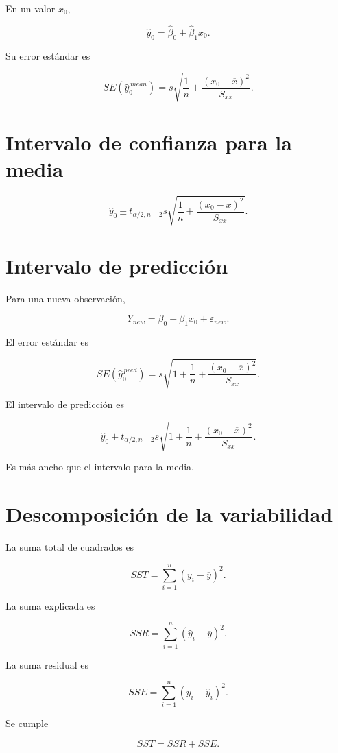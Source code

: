 \documentclass[
  spanish,
  11pt,
  letterpaper,
  DIV=11,
  numbers=noendperiod]{scrreprt}
\theoremstyle{definition}
\theoremstyle{plain}
\theoremstyle{definition}
\theoremstyle{remark}
\begin{document}
En un valor \(x_0\),

\[
\widehat{y}_0
=
\widehat{\beta}_0
+
\widehat{\beta}_1x_0.
\]

Su error estándar es

\[
SE
(
\widehat{y}_0^{\,mean}
)
=
s
\sqrt{
\frac{1}{n}
+
\frac{
(x_0-\overline{x})^2
}{
S_{xx}
}
}.
\]

\section{Intervalo de confianza para la
media}\label{intervalo-de-confianza-para-la-media}

\[
\widehat{y}_0
\pm
t_{\alpha/2,n-2}
s
\sqrt{
\frac{1}{n}
+
\frac{
(x_0-\overline{x})^2
}{
S_{xx}
}
}.
\]

\section{Intervalo de predicción}\label{intervalo-de-predicciuxf3n}

Para una nueva observación,

\[
Y_{new}
=
\beta_0+\beta_1x_0+\varepsilon_{new}.
\]

El error estándar es

\[
SE
(
\widehat{y}_0^{\,pred}
)
=
s
\sqrt{
1
+
\frac{1}{n}
+
\frac{
(x_0-\overline{x})^2
}{
S_{xx}
}
}.
\]

El intervalo de predicción es

\[
\widehat{y}_0
\pm
t_{\alpha/2,n-2}
s
\sqrt{
1
+
\frac{1}{n}
+
\frac{
(x_0-\overline{x})^2
}{
S_{xx}
}
}.
\]

Es más ancho que el intervalo para la media.

\section{Descomposición de la
variabilidad}\label{descomposiciuxf3n-de-la-variabilidad}

La suma total de cuadrados es

\[
SST
=
\sum_{i=1}^{n}
(y_i-\overline{y})^2.
\]

La suma explicada es

\[
SSR
=
\sum_{i=1}^{n}
(\widehat{y}_i-\overline{y})^2.
\]

La suma residual es

\[
SSE
=
\sum_{i=1}^{n}
(y_i-\widehat{y}_i)^2.
\]

Se cumple

\[
SST
=
SSR
+
SSE.
\]
\end{document}
